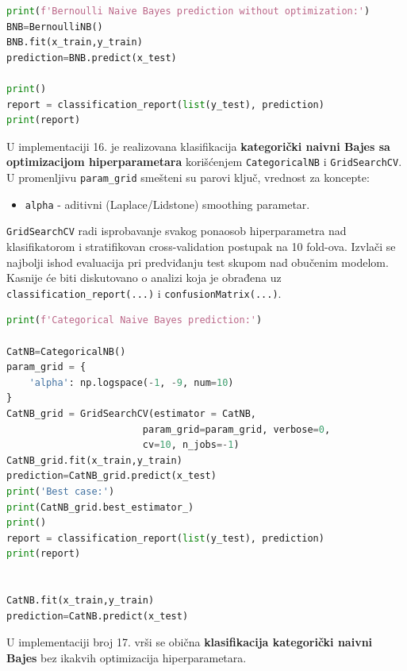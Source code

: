 \documentclass[fontsize=12bp, paper=a4]{scrarticle}
\begin{document}
\begin{lstlisting}[language=Python, caption=Bernulijev naivni Bajes bez ikakvih optimizacija hiperparametara.]
print(f'Bernoulli Naive Bayes prediction without optimization:')
BNB=BernoulliNB()
BNB.fit(x_train,y_train)
prediction=BNB.predict(x_test)

print()
report = classification_report(list(y_test), prediction)
print(report)
\end{lstlisting}
U implementaciji 16. je realizovana klasifikacija \textbf{kategorički naivni Bajes sa optimizacijom hiperparametara} korišćenjem \verb|CategoricalNB|\cite{CatNB} i \verb|GridSearchCV|. U promenljivu \verb|param_grid| smešteni su parovi ključ, vrednost za koncepte:
\begin{itemize}
    \item \verb|alpha| - aditivni (Laplace/Lidstone) smoothing parametar.
\end{itemize} 
\verb*|GridSearchCV| radi isprobavanje svakog ponaosob hiperparametra nad klasifikatorom i stratifikovan cross-validation postupak na 10 fold-ova. Izvlači se najbolji ishod evaluacija pri predviđanju test skupom nad obučenim modelom. Kasnije će biti diskutovano o analizi koja je obrađena uz \verb|classification_report(...)| i \verb|confusionMatrix(...)|.
\begin{lstlisting}[language=Python, caption=Kategorički naivni Bajes sa optimizacijama hiperparametara.]
print(f'Categorical Naive Bayes prediction:')

CatNB=CategoricalNB()
param_grid = {
    'alpha': np.logspace(-1, -9, num=10)
}
CatNB_grid = GridSearchCV(estimator = CatNB,
						param_grid=param_grid, verbose=0, 									
                        cv=10, n_jobs=-1)
CatNB_grid.fit(x_train,y_train)
prediction=CatNB_grid.predict(x_test)
print('Best case:')
print(CatNB_grid.best_estimator_)
print()
report = classification_report(list(y_test), prediction)
print(report)


CatNB.fit(x_train,y_train)
prediction=CatNB.predict(x_test)
\end{lstlisting}
U implementaciji broj 17. vrši se obična \textbf{klasifikacija kategorički naivni Bajes } bez ikakvih optimizacija hiperparametara.
\end{document}
